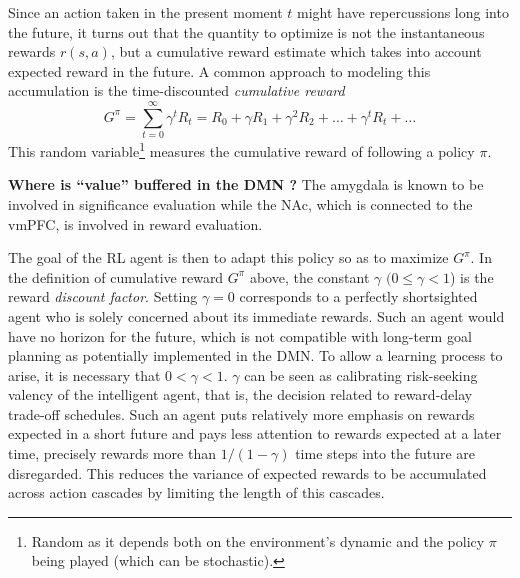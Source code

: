 \documentclass[10pt,letterpaper]{article}
\begin{document}
Since an action taken in the present moment $t$
might have repercussions long into the future, it turns out that the
quantity to optimize is not the instantaneous rewards $r(s, a)$, but a
cumulative reward estimate which takes into account expected reward in the future.
A common approach to
modeling this accumulation is the time-discounted \textit{cumulative reward}%
\begin{equation}
  \label{eq:cumr}
  G^\pi = \sum_{t=0}^{\infty}\gamma^{t}R_t = R_0 + \gamma R_1 + \gamma^2 R_2 + \ldots + \gamma^tR_t + \ldots
\end{equation}
This random variable\footnote{Random as it depends both on the environment's dynamic and the
  policy $\pi$ being played (which can be stochastic).}  measures the cumulative reward of
following a policy $\pi$.
\begin{mdframed}
  \textbf{Where is ``value'' buffered in the DMN ?
    }
  The amygdala is known to be involved in significance evaluation while
  the NAc, which is connected to the vmPFC, is involved in reward evaluation.
\end{mdframed}
  The goal of the RL agent is then to adapt this policy so as to  maximize $G^\pi$. In
  the definition of cumulative reward $G^\pi$ above, the constant $\gamma$ $(0 \le \gamma < 1$) is the reward \textit{discount factor}.
Setting $\gamma = 0$ corresponds to a perfectly shortsighted agent who is solely concerned about its immediate rewards.
Such an agent would have no horizon for the future,
which is not compatible with long-term goal planning
as potentially implemented in the DMN.
To allow a learning process to arise,
it is necessary that $0 < \gamma < 1$.
$\gamma$ can be seen as calibrating risk-seeking valency of the intelligent agent,
that is, the decision related to reward-delay trade-off schedules.
Such an agent puts relatively more emphasis on rewards expected in
a short future and pays less attention to
rewards expected at a later time, precisely rewards more than $1/(1 - \gamma)$ time steps into the future are disregarded.
This reduces the variance of expected rewards to be accumulated across action cascades by limiting the length of this cascades.
\end{document}
